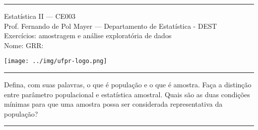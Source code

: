 \documentclass[a4paper,11pt,fleqn]{article}\usepackage[]{graphicx}\usepackage[]{color}
\theoremstyle{definition}
\begin{document}
\reversemarginpar %





\hrule
\vspace{0.3cm}

\begin{minipage}[c]{.85\textwidth}
  Estatística II --- CE003 \\
  Prof. Fernando de Pol Mayer --- Departamento de Estatística - DEST \\
  Exercícios: amostragem e análise exploratória de dados \\
  Nome:  \hfill GRR: \hspace{2cm}
\end{minipage}\hfill
\begin{minipage}[c]{.15\textwidth}
\flushright
\texttt{[image: ../img/ufpr-logo.png]}
\end{minipage}

\vspace{0.3cm}
\hrule
\vspace{0.3cm}

\begin{compactenum}[1.]
\item Defina, com suas palavras, o que é população e o que é
  amostra. Faça a distinção entre parâmetro populacional e estatística
  amostral. Quais são as duas condições mínimas para que uma amostra
  possa ser considerada representativa da população?
\end{compactenum}

\vspace{0.3cm}
\hrule
\vspace{0.3cm}
\end{document}
